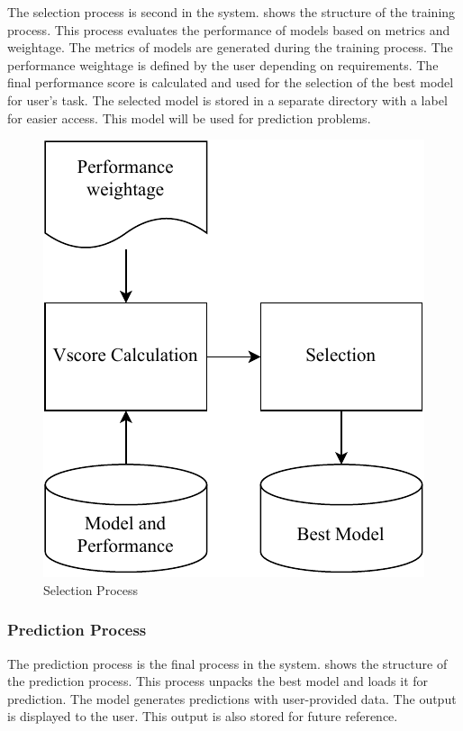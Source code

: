 \documentclass[a4paper,fleqn]{cas-dc}
\begin{document}
The selection process is second in the system.  shows the structure of the training process. This process evaluates the performance of models based on metrics and weightage. The metrics of models are generated during the training process. The performance weightage is defined by the user depending on requirements. The final performance score is calculated and used for the selection of the best model for user's task. The selected model is stored in a separate directory with a label for easier access. This model will be used for prediction problems.

\begin{figure}[ht]
    \centering
    \includegraphics[width=0.7\columnwidth]{selection.pdf}
    \caption{Selection Process}
    \label{fig:selection_process}
\end{figure}

\subsubsection{Prediction Process}\label{subsubsec:prediction_process}

The prediction process is the final process in the system.  shows the structure of the prediction process. This process unpacks the best model and loads it for prediction. The model generates predictions with user-provided data. The output is displayed to the user. This output is also stored for future reference.
\end{document}
